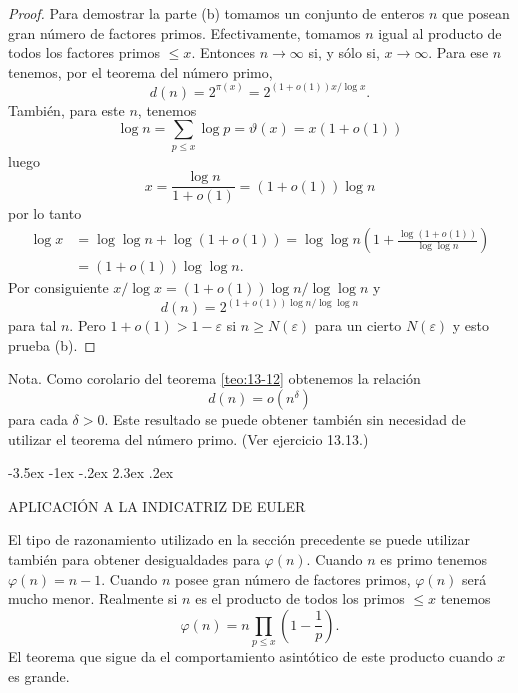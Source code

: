 \documentclass[12pt,a4paper]{book}
\makeatletter
\renewcommand\section{\@startsection{section}{1}{\z@}%
  {-3.5ex \@plus -1ex \@minus -.2ex}%
  {2.3ex \@plus .2ex}%
  {\normalfont\Large\bfseries\raggedright}}
\makeatother
\begin{document}
\begin{proof}
        Para demostrar la parte (b) tomamos un conjunto de enteros $n$ que posean gran número de
        factores primos. Efectivamente, tomamos $n$ igual al producto de todos los factores
        primos $\leq x$. Entonces $n\to\infty$ si, y sólo si, $x\to\infty$. Para ese $n$ tenemos,
        por el teorema del número primo,
        \begin{equation*}
            d(n)=2^{\pi(x)}=2^{(1+o(1))x/\log x}.
        \end{equation*}
        También, para este $n$, tenemos
        \begin{equation*}
            \log n=\sum_{p\leq x}\log p=\vartheta(x)=x(1+o(1))
        \end{equation*}
        luego
        \begin{equation*}
            x=\frac{\log n}{1+o(1)}=(1+o(1))\log n
        \end{equation*}
        por lo tanto
        \begin{align*}
            \log x&=\log\log n+\log(1+o(1))=\log\log n\left(1+\frac{\log(1+o(1))}{\log\log n}\right)\\
            &=(1+o(1))\log\log n.
        \end{align*}
        Por consiguiente $x/\log x=(1+o(1))\log n/\log\log n$ y
        \begin{equation*}
            d(n)=2^{(1+o(1))\log n/\log\log n}
        \end{equation*}
        para tal $n$. Pero $1+o(1)>1-\varepsilon$ si $n\geq N(\varepsilon)$ para un cierto
        $N(\varepsilon)$ y esto prueba (b).
    \end{proof}

    Nota. Como corolario del teorema \ref{teo:13-12} obtenemos la relación
    \begin{equation}\label{eq:13-31}
        d(n)=o(n^{\delta})
    \end{equation}
    para cada $\delta>0$. Este resultado se puede obtener también sin necesidad de utilizar el
    teorema del número primo. (Ver ejercicio 13.13.)

    \section{APLICACIÓN A LA INDICATRIZ DE EULER}

    El tipo de razonamiento utilizado en la sección precedente se puede utilizar también para
    obtener desigualdades para $\varphi(n)$. Cuando $n$ es primo tenemos $\varphi(n)=n-1$.
    Cuando $n$ posee gran número de factores primos, $\varphi(n)$ será mucho menor. Realmente si
    $n$ es el producto de todos los primos $\leq x$ tenemos
    \begin{equation*}
        \varphi(n)=n\prod_{p\leq x}\left(1-\frac{1}{p}\right).
    \end{equation*}
    El teorema que sigue da el comportamiento asintótico de este producto cuando $x$ es grande.
\end{document}
